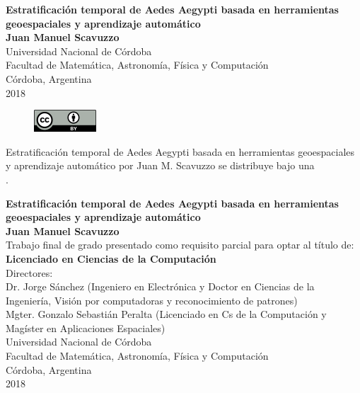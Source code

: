 \begin{center}
\begin{figure}
\centering%
%
\end{figure}
\thispagestyle{empty} \vspace*{0.1cm} \textbf{\huge
Estratificación temporal de Aedes Aegypti basada en herramientas geoespaciales y aprendizaje automático}\\[4.5cm]
\Large\textbf{Juan Manuel Scavuzzo}\\[0.5cm]
\small Universidad Nacional de Córdoba\\
Facultad de Matemática, Astronomía, Física y Computación\\
Córdoba, Argentina\\
2018\\

\begin{figure}[H]
\centering
\href{http://creativecommons.org/licenses/by-nc-sa/4.0/}{
\includegraphics[scale=0.95]{images/cc_by}}
\end{figure}
    \footnotesize Estratificación temporal de Aedes Aegypti basada en herramientas geoespaciales y aprendizaje automático por Juan M. Scavuzzo se distribuye bajo una \\
    \href{http://creativecommons.org/licenses/by-nc-sa/4.0/}{\color{blue}{Licencia Creative Commons Atribución-NoComercial-CompartirIgual 4.0 Internacional}}.

\end{center}

\newpage{\pagestyle{empty}\cleardoublepage}

\newpage
\begin{center}
\thispagestyle{empty} \vspace*{0cm} \textbf{\huge
Estratificación temporal de Aedes Aegypti basada en herramientas geoespaciales y aprendizaje automático}\\[6.0cm]
\Large\textbf{Juan Manuel Scavuzzo}\\[2.0cm]
\small Trabajo final de grado presentado como requisito parcial para optar al
título de:\\
\textbf{Licenciado en Ciencias de la Computación}\\[2.0cm]
Directores:\\

Dr. Jorge Sánchez (Ingeniero en Electrónica y Doctor en Ciencias de la Ingeniería, Visión por computadoras y reconocimiento de patrones)\\
Mgter. Gonzalo Sebastián Peralta (Licenciado en Cs de la Computación y Magíster en Aplicaciones Espaciales)\\ [2.0cm]

Universidad Nacional de Córdoba\\
Facultad de Matemática, Astronomía, Física y Computación\\
Córdoba, Argentina\\
2018\\\end{center}


